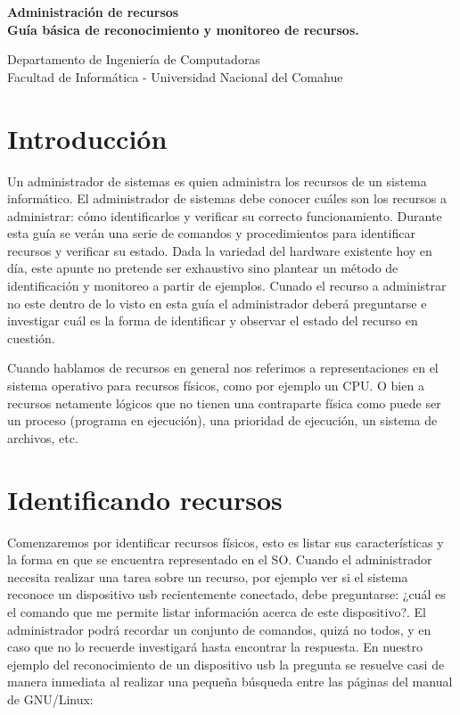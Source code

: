 \documentclass[12pt]{article}
\def\maketitle{

 \makeatletter
 {\color{bl} \centering \huge \sc \textbf{
 Administración de recursos \\ 
\large \vspace*{-8pt} \color{black} Guía básica de reconocimiento y monitoreo de recursos. 
 \vspace*{8pt} }\par}
 \makeatother


 \makeatletter
 {\centering \small 
 	Departamento de Ingeniería de Computadoras \\
 	Facultad de Informática - Universidad Nacional del Comahue \\
 	\vspace{20pt} }
 \makeatother

}
\begin{document}
\thispagestyle{empty}
\maketitle
\setlength{\parindent}{0pt}

\section*{Introducción}

Un administrador de sistemas es quien administra los recursos de un sistema informático. El administrador
de sistemas debe conocer cuáles son los recursos a administrar: cómo identificarlos y verificar su 
correcto funcionamiento. Durante esta guía se verán una serie de comandos y procedimientos para identificar 
recursos y verificar su estado. Dada la variedad del hardware existente hoy en día, este apunte no pretende
ser exhaustivo sino plantear un método de identificación y monitoreo a partir de ejemplos. Cunado 
el recurso a administrar no este dentro de lo visto en esta guía el administrador deberá preguntarse e
investigar cuál es la forma de identificar y observar el estado del recurso en cuestión. 

Cuando hablamos de recursos en general nos referimos a representaciones en el sistema operativo para 
recursos físicos, como por ejemplo un CPU. O bien a recursos netamente lógicos que no tienen una
contraparte física como puede ser un proceso (programa en ejecución), una prioridad de ejecución, 
un sistema de archivos, etc. 


\section*{Identificando recursos}

Comenzaremos por identificar recursos físicos, esto es listar sus características y la forma en que 
se encuentra representado en el SO. Cuando el administrador necesita realizar una tarea
sobre un recurso, por ejemplo ver si el sistema reconoce un dispositivo usb recientemente conectado, 
debe preguntarse: ¿cuál es el comando que me permite listar información acerca de este dispositivo?. 
El administrador podrá recordar un conjunto de comandos, quizá no todos, y en caso que no lo recuerde
investigará hasta encontrar la respuesta. En nuestro ejemplo del reconocimiento de un dispositivo 
usb la pregunta se resuelve casi de manera inmediata al realizar una pequeña búsqueda entre las páginas
del manual de GNU/Linux: 
\end{document}
